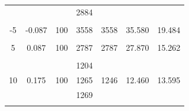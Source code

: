 \documentclass[%
 reprint,
nofootinbib,
 amsmath,amssymb,
 aps,
floatfix,
]{revtex4-2}
\begin{document}
\begin{table}[]
\begin{tabular}{@{}ccccccc@{}}
                                                            &                                                                &                                                         & 2884         &                                                                      &                                                                     &   \\                                                                                \\
    -5                                                      & -0.087                                                         & 100                                                     & 3558         & 3558                                                                 & 35.580                                                              & 19.484                                                                            \\ \\
    5                                                       & 0.087                                                          & 100                                                     & 2787         & 2787                                                                 & 27.870                                                              & 15.262                                                                            \\ \\
    \multirow{3}{*}{10}                                     & \multirow{3}{*}{0.175}                                         & \multirow{3}{*}{100}                                    & 1204         & \multirow{3}{*}{1246}                                                & \multirow{3}{*}{12.460}                                             & \multirow{3}{*}{13.595}                                                           \\
                                                            &                                                                &                                                         & 1265         &                                                                      &                                                                     &                                                                                   \\
                                                            &                                                                &                                                         & 1269         &                                                                      &                                                                     &  \\                                                                                 \\

\end{tabular}
\end{table}
\end{document}
